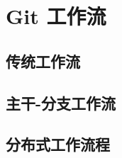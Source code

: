 \documentclass[../main.tex]{subfiles}
\begin{document}
\section{Git 工作流}

\subsection{传统工作流}

\subsection{主干-分支工作流}

\subsection{分布式工作流程}
\end{document}
